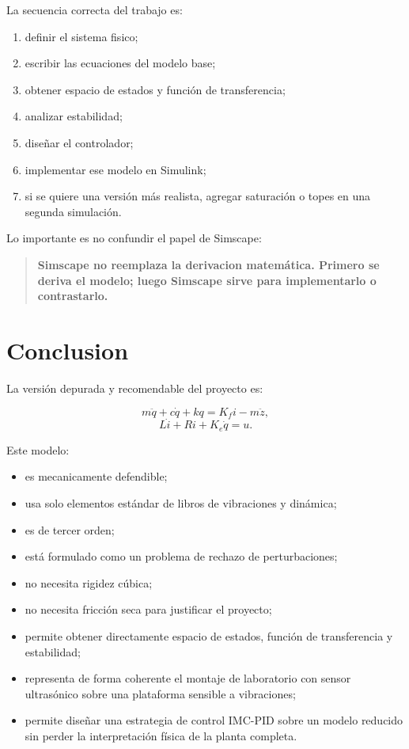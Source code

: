 \documentclass[11pt]{article}
\begin{document}
La secuencia correcta del trabajo es:

\begin{enumerate}[leftmargin=1.2cm]
\item definir el sistema fisico;
\item escribir las ecuaciones del modelo base;
\item obtener espacio de estados y funci\'on de transferencia;
\item analizar estabilidad;
\item dise\~nar el controlador;
\item implementar ese modelo en Simulink;
\item si se quiere una versi\'on m\'as realista, agregar saturaci\'on o topes en una segunda simulaci\'on.
\end{enumerate}

Lo importante es no confundir el papel de Simscape:

\begin{quote}
\textbf{Simscape no reemplaza la derivacion matem\'atica. Primero se deriva el modelo; luego Simscape sirve para implementarlo o contrastarlo.}
\end{quote}

\section{Conclusion}

La versi\'on depurada y recomendable del proyecto es:

\begin{equation}
m\ddot q + c\dot q + kq = K_f i - m\ddot z,
\end{equation}
\begin{equation}
L\dot i + Ri + K_e\dot q = u.
\end{equation}

Este modelo:

\begin{itemize}[leftmargin=1.2cm]
\item es mecanicamente defendible;
\item usa solo elementos est\'andar de libros de vibraciones y din\'amica;
\item es de tercer orden;
\item est\'a formulado como un problema de rechazo de perturbaciones;
\item no necesita rigidez c\'ubica;
\item no necesita fricci\'on seca para justificar el proyecto;
\item permite obtener directamente espacio de estados, funci\'on de transferencia y estabilidad;
\item representa de forma coherente el montaje de laboratorio con sensor ultras\'onico sobre una plataforma sensible a vibraciones;
\item permite dise\~nar una estrategia de control IMC-PID sobre un modelo reducido sin perder la interpretaci\'on f\'isica de la planta completa.
\end{itemize}
\end{document}
